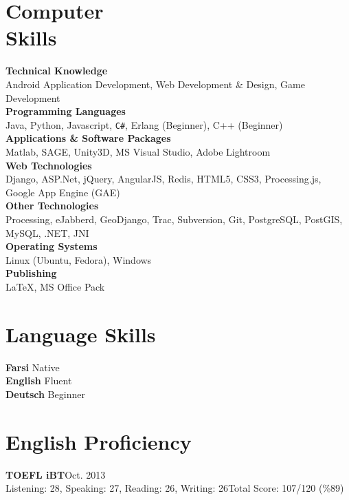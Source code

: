 \documentclass[margin,line]{resume}
\begin{document}
\begin{resume}
    \section{\mysidestyle Computer\\Skills} 
    \textbf{Technical Knowledge}‎\\
    Android Application Development, Web Development \& Design, Game Development\vspace{1mm}\\
	‎\textbf{Programming Languages}‎\\
	 ‎‎Java, Python, Javascript, \texttt{C\#}, Erlang (Beginner), C++ (Beginner)\vspace{1mm}\\
	 ‎\textbf{Applications \& Software Packages}‎\\
	 Matlab, SAGE, Unity3D, MS Visual Studio, Adobe Lightroom\vspace{1mm}\\
	 ‎\textbf{Web Technologies}‎\\
	 ‎‎Django, ASP.Net, jQuery, AngularJS, Redis, HTML5, CSS3, Processing.js, Google App Engine (GAE)\vspace{1mm}\\
	 ‎\textbf{Other Technologies}‎\\
	 Processing, eJabberd, GeoDjango, Trac, Subversion, Git, PostgreSQL, PostGIS, MySQL, .NET, JNI\vspace{1mm}\\
	 ‎\textbf{Operating Systems}‎\\
	 Linux (Ubuntu, Fedora), Windows\vspace{1mm}\\
	 ‎\textbf{Publishing}‎\\
	\LaTeX, MS Office Pack
    
     \section{\mysidestyle Language Skills} 
     {\bf Farsi} Native\\
     {\bf English} Fluent\\
     {\bf Deutsch} Beginner\\
    
    
     \section{\mysidestyle English Proficiency} 
     {\bf TOEFL iBT}\vspace{1mm}\hfill {\sf Oct. 2013}\\
    Listening: 28, Speaking: 27, Reading: 26, Writing: 26\vspace{2mm}\hfill {\sf Total Score: 107/120 (\%89)}\\
    

\end{resume}
\end{document}
